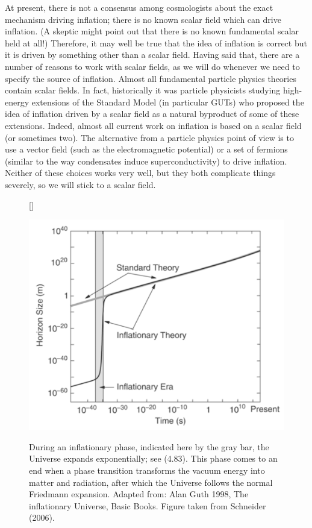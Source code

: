 \documentclass[a4paper,11pt]{article}
\begin{document}
{\noindent}At present, there is not a consensus among cosmologists about the exact mechanism driving inflation; there is no known scalar field which can drive inflation. (A skeptic might point out that there is no known fundamental scalar held at all!) Therefore, it may well be true that the idea of inflation is correct but it is driven by something other than a scalar field. Having said that, there are a number of reasons to work with scalar fields, as we will do whenever we need to specify the source of inflation. Almost all fundamental particle physics theories contain scalar fields. In fact, historically it was particle physicists studying high-energy extensions of the Standard Model (in particular GUTs) who proposed the idea of inflation driven by a scalar field as a natural byproduct of some of these extensions. Indeed, almost all current work on inflation is based on a scalar field (or sometimes two). The alternative from a particle physics point of view is to use a vector field (such as the electromagnetic potential) or a set of fermions (similar to the way condensates induce superconductivity) to drive inflation. Neither of these choices works very well, but they both complicate things severely, so we will stick to a scalar field.

\begin{figure}[h]
    [\FBwidth]
    {\caption{\footnotesize{During an inflationary phase, indicated here by the gray bar, the Universe expands exponentially; see (4.83). This phase comes to an end when a phase transition transforms the vacuum energy into matter and radiation, after which the Universe follows the normal Friedmann expansion. Adapted from: Alan Guth 1998, The inflationary Universe, Basic Books. Figure taken from Schneider (2006).}}
    \label{fig:inflation}}
    {\includegraphics[width=12cm]{figures/Inflation.png}}
\end{figure}
\end{document}
